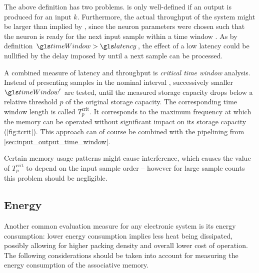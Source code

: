 The above definition has two problems. \latency is only well-defined if an output is produced for an input $k$. Furthermore, the actual throughput of the system might be larger than implied by \latency, since the neuron parameters were chosen such that the neuron is ready for the next input sample within a time window \timeWindow. As by definition $\timeWindow > \latency$, the effect of a low latency \latency could be nullified by the delay imposed by \timeWindow until a next sample can be processed.

A combined measure of latency and throughput is \emph{critical time window} analysis. Instead of presenting samples in the nominal interval \timeWindow, successively smaller $\timeWindow'$ are tested, until the measured storage capacity drops below a relative threshold $p$ of the original storage capacity. The corresponding time window length is called $T^\mathrm{crit}_p$. It corresponds to the maximum frequency at which the memory can be operated without significant impact on its storage capacity (\cref{fig:tcrit}). This approach can of course be combined with the pipelining from \cref{sec:input_output_time_window}.

Certain memory usage patterns might cause interference, which causes the value of $T^\mathrm{crit}_p$ to depend on the input sample order -- however for large sample counts \nSamples this problem should be negligible.

\subsection{Energy}
\label{sec:eval_energy}

Another common evaluation measure for any electronic system is its energy consumption: lower energy consumption implies less heat being dissipated, possibly allowing for higher packing density and overall lower cost of operation. The following considerations should be taken into account for measuring the energy consumption of the associative memory.

